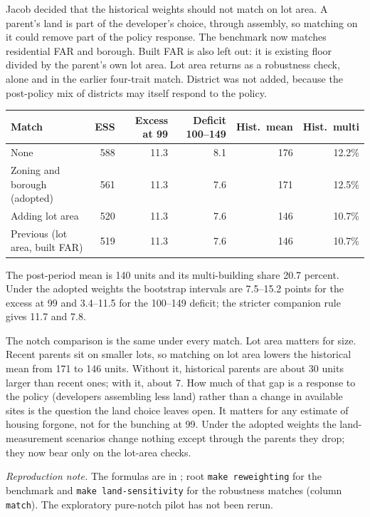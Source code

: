 Jacob decided that the historical weights should not match on lot area. A
parent's land is part of the developer's choice, through assembly, so matching
on it could remove part of the policy response. The benchmark now matches
residential FAR and borough. Built FAR is also left out: it is existing floor
divided by the parent's own lot area. Lot area returns as a robustness check,
alone and in the earlier four-trait match. District was not added, because
the post-policy mix of districts may itself respond to the policy.

\begin{center}
\small
\begin{tabular}{lrrrrr}
\hline
Match & ESS & Excess at 99 & Deficit 100--149 & Hist.\ mean & Hist.\ multi \\
\hline
None & 588 & 11.3 & 8.1 & 176 & 12.2\% \\
Zoning and borough (adopted) & 561 & 11.3 & 7.6 & 171 & 12.5\% \\
Adding lot area & 520 & 11.3 & 7.6 & 146 & 10.7\% \\
Previous (lot area, built FAR) & 519 & 11.3 & 7.6 & 146 & 10.7\% \\
\hline
\end{tabular}
\end{center}

The post-period mean is 140 units and its multi-building share 20.7 percent.
Under the adopted weights the bootstrap intervals are 7.5--15.2 points for the
excess at 99 and 3.4--11.5 for the 100--149 deficit; the stricter
companion rule gives 11.7 and 7.8.

The notch comparison is the same under every match. Lot area matters for
size. Recent parents sit on smaller lots, so matching on lot area lowers the
historical mean from 171 to 146 units. Without it, historical parents are about
30 units larger than recent ones; with it, about 7. How much of that gap is a
response to the policy (developers assembling less land) rather than a change
in available sites is the question the land choice leaves open. It matters for
any estimate of housing forgone, not for the bunching at 99. Under the adopted
weights the land-measurement scenarios change nothing except through the
parents they drop; they now bear only on the lot-area checks.

\textit{Reproduction note.} The formulas are in
; root \texttt{make reweighting}
for the benchmark and \texttt{make land-sensitivity} for the robustness
matches (column \texttt{match}). The exploratory pure-notch pilot has not been
rerun.
